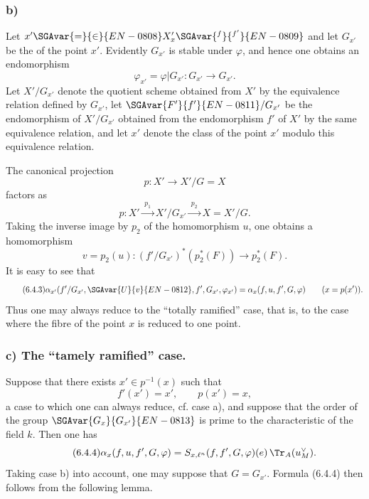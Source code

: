 \subsubsection*{b)} Let $x'\SGAvar{=}{\in}{EN-0808} X_x'\SGAvar{{}^{f}}{{}^{f'}}{EN-0809}$ and let $G_{x'}$ be the  of the point $x'$. Evidently $G_{x'}$ is stable under $\varphi$, and hence one obtains an endomorphism
\[
\varphi_{x'}=\varphi|G_{x'}:G_{x'}\longrightarrow G_{x'}.
\]
Let $X'/G_{x'}$ denote the quotient scheme obtained from $X'$ by the equivalence relation defined by $G_{x'}$, let $\SGAvar{F'}{f'}{EN-0811}/G_{x'}$ be the endomorphism of $X'/G_{x'}$ obtained from the endomorphism $f'$ of $X'$ by the same equivalence relation, and let $x'$ denote the class of the point $x'$ modulo this equivalence relation.

The canonical projection
\[
p:X'\longrightarrow X'/G=X
\]
factors as
\[
p:X'\xrightarrow{\;p_1\;}X'/G_{x'}\xrightarrow{\;p_2\;}X=X'/G.
\]
Taking the inverse image by $p_2$ of the homomorphism $u$, one obtains a homomorphism
\[
v=p_2(u):(f'/G_{x'})^*(p_2^*(F))\longrightarrow p_2^*(F).
\]
It is easy to see that
\begin{equation}\tag{6.4.3}
\alpha_{x'}(f'/G_{x'},\SGAvar{U}{v}{EN-0812},f',G_{x'},\varphi_{x'})
=
\alpha_x(f,u,f',G,\varphi)
\qquad (x=p(x')).
\end{equation}
Thus one may always reduce to the ``totally ramified'' case, that is, to the case where the fibre of the point $x$ is reduced to one point.

\subsubsection*{c) The ``tamely ramified'' case.} Suppose that there exists $x'\in p^{-1}(x)$ such that
\[
f'(x')=x',\qquad p(x')=x,
\]
a case to which one can always reduce, cf. case a), and suppose that the order of the group $\SGAvar{G_{x}}{G_{x'}}{EN-0813}$ is prime to the characteristic of the field $k$. Then one has
\begin{equation}\tag{6.4.4}
\alpha_x(f,u,f',G,\varphi)=S_{x,\ell^n}(f,f',G,\varphi)(e)\,\Tr_A(u_M^\vee).
\end{equation}
Taking case b) into account, one may suppose that $G=G_{x'}$. Formula (6.4.4) then follows from the following lemma.


